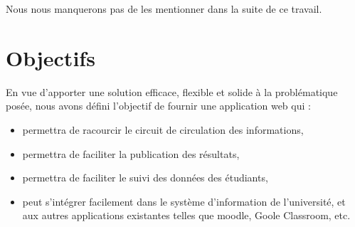 Nous nous manquerons pas de les mentionner dans la suite de ce travail.
\section{Objectifs}\label{sec:objectifs}
En vue d'apporter une solution efficace, flexible et solide à la problématique posée, nous avons
défini l'objectif de fournir une application web qui :
\begin{itemize}
    \item permettra de racourcir le circuit de circulation des informations,
    \item permettra de faciliter la publication des résultats,
    \item permettra de faciliter le suivi des données des étudiants,
    \item peut s'intégrer facilement dans le système d'information de l'université, et aux autres applications existantes telles que moodle, Goole Classroom, etc.
\end{itemize}
